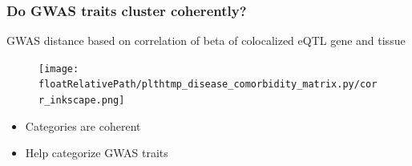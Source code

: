 \documentclass{beamer}
\newcommand*{\floatRelativePath}{../out/gwas417/pval_5e-08/r2_0.1/kb_1000/window_1000000/75_50}%
\begin{document}
    \begin{frame}
        \frametitle{Do GWAS traits cluster coherently?}


        GWAS distance based on correlation of beta of colocalized eQTL gene and tissue

        \begin{figure}[!]
            \texttt{[image: \\floatRelativePath/plthtmp\_disease\_comorbidity\_matrix.py/corr\_inkscape.png]}
        \end{figure}

        \begin{itemize}
            \item Categories are coherent
            \item Help categorize GWAS traits
        \end{itemize}


    \end{frame}

%
%
\end{document}
